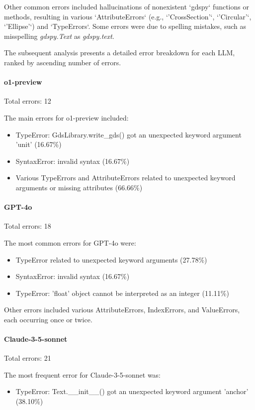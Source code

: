 \documentclass{article}
\begin{document}
Other common errors included hallucinations of nonexistent `gdspy` functions or methods, resulting in various `AttributeErrors` (e.g., `'CrossSection'`, `'Circular'`, `'Ellipse'`) and `TypeErrors`. Some errors were due to spelling mistakes, such as misspelling \textit{gdspy.Text} as \textit{gdspy.text}.

The subsequent analysis presents a detailed error breakdown for each LLM, ranked by ascending number of errors.

\paragraph{o1-preview}
Total errors: 12

The main errors for o1-preview included:
\begin{itemize}
    \item TypeError: GdsLibrary.write\_gds() got an unexpected keyword argument 'unit' (16.67\%)
    \item SyntaxError: invalid syntax (16.67\%)
    \item Various TypeErrors and AttributeErrors related to unexpected keyword arguments or missing attributes (66.66\%)
\end{itemize}

\paragraph{GPT-4o}
Total errors: 18

The most common errors for GPT-4o were:
\begin{itemize}
    \item TypeError related to unexpected keyword arguments (27.78\%)
    \item SyntaxError: invalid syntax (16.67\%)
    \item TypeError: 'float' object cannot be interpreted as an integer (11.11\%)
\end{itemize}

Other errors included various AttributeErrors, IndexErrors, and ValueErrors, each occurring once or twice.

\paragraph{Claude-3-5-sonnet}
Total errors: 21

The most frequent error for Claude-3-5-sonnet was:
\begin{itemize}
    \item TypeError: Text.\_\_init\_\_() got an unexpected keyword argument 'anchor' (38.10\%)
\end{itemize}
\end{document}
